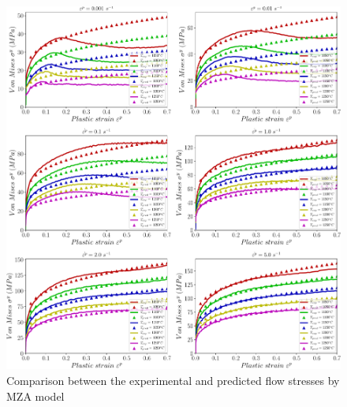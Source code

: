 \documentclass[twoside,english,1p,final,sort&compress]{elsarticle}
\theoremstyle{plain}
\begin{document}
\begin{table}[h!]
\centering{}
\caption{Parameters' constants of Modified--Zerilli-Armstrong Model}
\end{table}
\begin{figure}[!ht]
\centering
\includegraphics[width=1.02\columnwidth]
{newFigures/CompExpMZA}
\caption{Comparison between the experimental and predicted flow stresses by MZA model}
\label{fig:iCorrelationMZA}
\end{figure}
\FloatBarrier

\end{document}
